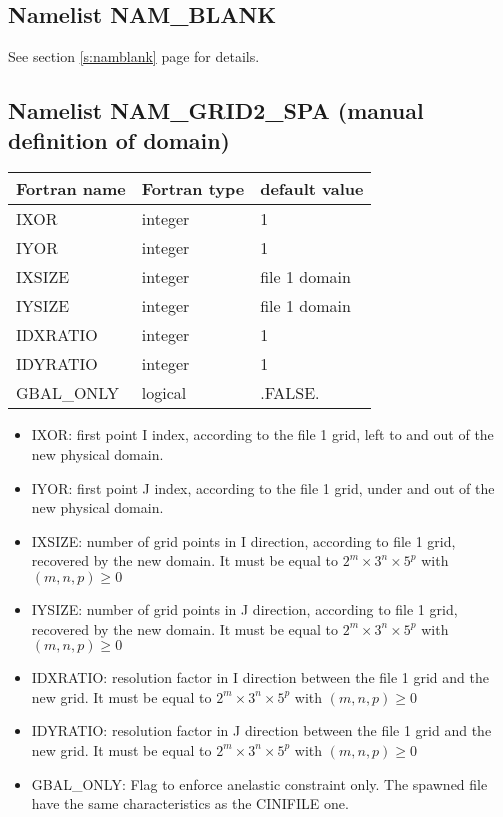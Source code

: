 \subsection{Namelist NAM\_BLANK} 
See section \ref{s:namblank} page \pageref{s:namblank} for details.
\newpage

\subsection{Namelist NAM\_GRID2\_SPA (manual definition of domain) }

\begin{center}
\begin{tabular} {|l|l|l|}
\hline
Fortran name & Fortran type & default value\\
\hline
\hline
IXOR         & integer    & 1   \\
IYOR         & integer    & 1  \\
IXSIZE       & integer    & file 1 domain  \\
IYSIZE       & integer    & file 1 domain \\
IDXRATIO     & integer    & 1   \\
IDYRATIO     & integer    & 1  \\
GBAL\_ONLY    & logical    & .FALSE.  \\
\hline
\end{tabular}
\end{center}


\begin{itemize}
\item IXOR: first point I index, according to the file 1 grid, left to 
and out of the new physical domain.
\item IYOR: first point J index, according to the file 1 grid, under 
and out of the new physical domain.
\item IXSIZE: number of grid points in I direction, according to file 1 grid, recovered
by the new domain. It must be equal to $2^m \times 3^n \times 5^p$ with $(m,n,p) \ge 0$
\item IYSIZE: number of grid points in J direction, according to file 1 grid, recovered
by the new domain. It must be equal to $2^m \times 3^n \times 5^p$ with $(m,n,p) \ge 0$
\item IDXRATIO: resolution factor in I direction between the file 1 grid and the new grid.
It must be  equal to $2^m \times 3^n \times 5^p$ with $(m,n,p) \ge 0$
\item IDYRATIO: resolution factor in J direction between the file 1 grid and the new grid.
It must be equal to $2^m \times 3^n \times 5^p$ with $(m,n,p) \ge 0$
\item GBAL\_ONLY: Flag  to enforce anelastic constraint only. The spawned file have the same characteristics as the CINIFILE one.
\end{itemize}

